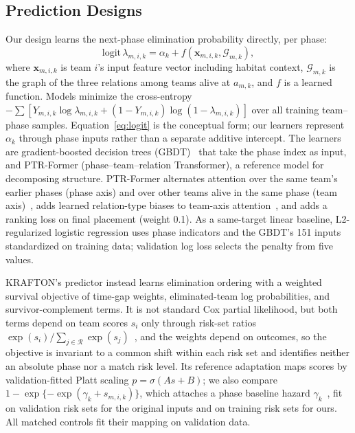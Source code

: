 \documentclass[sigconf,anonymous,nonacm]{acmart}
\begin{document}
\subsection{Prediction Designs}
\label{sec:method:rq2}
Our design learns the next-phase elimination probability directly, per phase:
\begin{equation}
\mathrm{logit}\,\lambda_{m,i,k}=\alpha_k+f(\mathbf{x}_{m,i,k},\mathcal{G}_{m,k}),
\label{eq:logit}
\end{equation}
where $\mathbf{x}_{m,i,k}$ is team $i$'s input feature vector including habitat context, $\mathcal{G}_{m,k}$ is the graph of the three relations among teams alive at $a_{m,k}$, and $f$ is a learned function.
Models minimize the cross-entropy $-\sum[Y_{m,i,k}\log\lambda_{m,i,k}+(1-Y_{m,i,k})\log(1-\lambda_{m,i,k})]$ over all training team--phase samples.
Equation~\eqref{eq:logit} is the conceptual form; our learners represent $\alpha_k$ through phase inputs rather than a separate additive intercept. The learners are gradient-boosted decision trees (GBDT)~\cite{Friedman01} that take the phase index as input, and PTR-Former (phase--team--relation Transformer), a reference model for decomposing structure.
PTR-Former alternates attention over the same team's earlier phases (phase axis) and over other teams alive in the same phase (team axis)~\cite{Vaswani17}, adds learned relation-type biases to team-axis attention~\cite{Ying21}, and adds a ranking loss on final placement (weight 0.1). As a same-target linear baseline, L2-regularized logistic regression uses phase indicators and the GBDT's 151 inputs standardized on training data; validation log loss selects the penalty from five values.

KRAFTON's predictor instead learns elimination ordering with a weighted survival objective of time-gap weights, eliminated-team log probabilities, and survivor-complement terms. It is not standard Cox partial likelihood, but both terms depend on team scores $s_i$ only through risk-set ratios $\exp(s_i)/\sum_{j\in\mathcal{R}}\exp(s_j)$~\cite{Cox72}, and the weights depend on outcomes, so the objective is invariant to a common shift within each risk set and identifies neither an absolute phase nor a match risk level. Its reference adaptation maps scores by validation-fitted Platt scaling $p=\sigma(A s+B)$; we also compare $1-\exp\{-\exp(\gamma_k+s_{m,i,k})\}$, which attaches a phase baseline hazard $\gamma_k$~\cite{PrenticeGloeckler78}, fit on validation risk sets for the original inputs and on training risk sets for ours. All matched controls fit their mapping on validation data.
\end{document}

